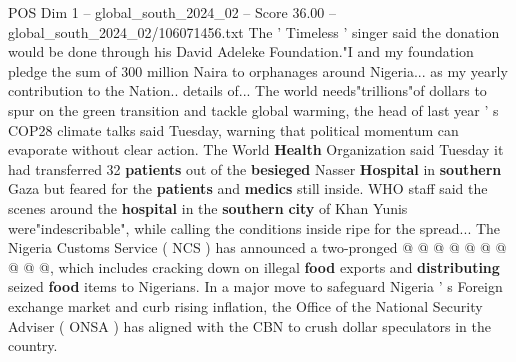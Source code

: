 \begin{textsample}{POS Dim 1 – global\_south\_2024\_02 – Score 36.00 – global\_south\_2024\_02/106071456.txt}
The ' Timeless ' singer said the donation would be done through his David Adeleke Foundation."I and my foundation pledge the sum of 300 million Naira to orphanages around Nigeria... as my yearly contribution to the Nation.. details of...
The world needs"trillions"of dollars to spur on the green transition and tackle global warming, the head of last year ' s COP28 climate talks said Tuesday, warning that political momentum can evaporate without clear action.
The World \textbf{Health} Organization said Tuesday it had transferred 32 \textbf{patients} out of the \textbf{besieged} Nasser \textbf{Hospital} in \textbf{southern} Gaza but feared for the \textbf{patients} and \textbf{medics} still inside.
WHO staff said the scenes around the \textbf{hospital} in the \textbf{southern} \textbf{city} of Khan Yunis were"indescribable", while calling the conditions inside ripe for the spread...
The Nigeria Customs Service ( NCS ) has announced a two-pronged @ @ @ @ @ @ @ @ @ @, which includes cracking down on illegal \textbf{food} exports and \textbf{distributing} seized \textbf{food} items to Nigerians.
In a major move to safeguard Nigeria ' s Foreign exchange market and curb rising inflation, the Office of the National Security Adviser ( ONSA ) has aligned with the CBN to crush dollar speculators in the country.

\end{textsample}

